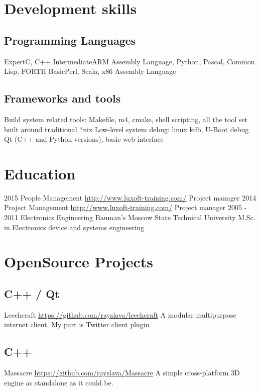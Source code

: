 \documentclass[11pt,a4paper]{moderncv}
\begin{document}
\section{Development skills}
\subsection{Programming Languages}
\cvitem
  {Expert}{C, C++}
\cvitem
  {Intermediate}{ARM Assembly Language, Python, Pascal, Common Lisp, FORTH}
\cvitem
  {Basic}{Perl, Scala, x86 Assembly Language}

\subsection{Frameworks and tools}
{Build system related tools: Makefile, m4, cmake, shell scripting, all the tool set built around traditional *nix}
{Low-level system debug: linux kdb, U-Boot debug}
{Qt (C++ and Python versions), basic web-interface}

\section{Education}
  \cventry
    {2015}
    {People Management}
    {\url{http://www.luxoft-training.com/}}
    {}{}
    {Project manager}
  \cventry
    {2014}
    {Project Management}
    {\url{http://www.luxoft-training.com/}}
    {}{}
    {Project manager}
  \cventry
    {2005 - 2011}
    {Electronics Engineering}
    {Bauman's Moscow State Technical University}
    {}{}
    {M.Sc. in Electronics device and systems engineering}

\section{OpenSource Projects}
\subsection{C++ / Qt}
\cvitem
  {Leechcraft}
  {\url{https://github.com/rayslava/leechcraft}\newline{}
  A modular multipurpose internet client. My part is Twitter client plugin}

\subsection{C++}
\cvitem
  {Massacre}
  {\url{https://github.com/rayslava/Massacre}\newline{}
    A simple cross-platform 3D engine as standalone as it could be.}
\end{document}

